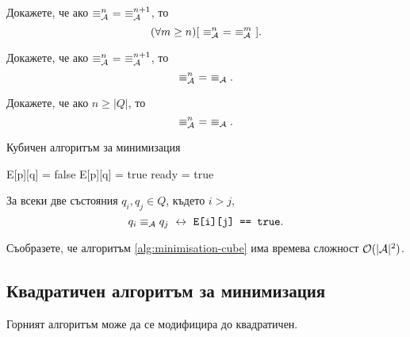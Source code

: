 \begin{problem}
  Докажете, че ако $\equiv^n_\A\ =\ \equiv^{n+1}_\A$, то
  \[(\forall m \geq n)[\ \equiv^n_{\mathcal{A}}\ =\ \equiv^m_{\mathcal{A}}\ ].\]
\end{problem}

\begin{problem}
  Докажете, че ако $\equiv^n_\A\ =\ \equiv^{n+1}_\A$, то
  \[\equiv^n_\A\ =\ \equiv_\A.\]
\end{problem}

\begin{problem}
  Докажете, че ако $n \geq |Q|$, то
  \[\equiv^n_\A\ =\ \equiv_\A.\]
\end{problem}




\begin{algorithm}[H]
  \caption{Кубичен алгоритъм за минимизация}
  \label{alg:minimisation-cube}
  \begin{algorithmic}[1]
    \State E[p][q] = false 
    \Else
    \State E[p][q] = true 
    \EndIf
    \EndFor
    \EndFor
    \Repeat
    \State ready = true
      
    \EndIf
    \EndFor
    \EndIf
    \EndFor
    \EndFor
  \end{algorithmic}
\end{algorithm}

\begin{theorem}
  За всеки две състояния $q_i,q_j \in Q$, където $i > j$,
  \[q_i \equiv_{\mathcal{A}} q_j \ \leftrightarrow\  \texttt{E[i][j] == true}.\]
\end{theorem}

\begin{problem}
  Съобразете, че алгоритъм \ref{alg:minimisation-cube} има времева сложност $\mathcal{O}(|\mathcal{A}|^2)$.
\end{problem}


\subsection{Квадратичен алгоритъм за минимизация}

Горният алгоритъм може да се модифицира до квадратичен.

